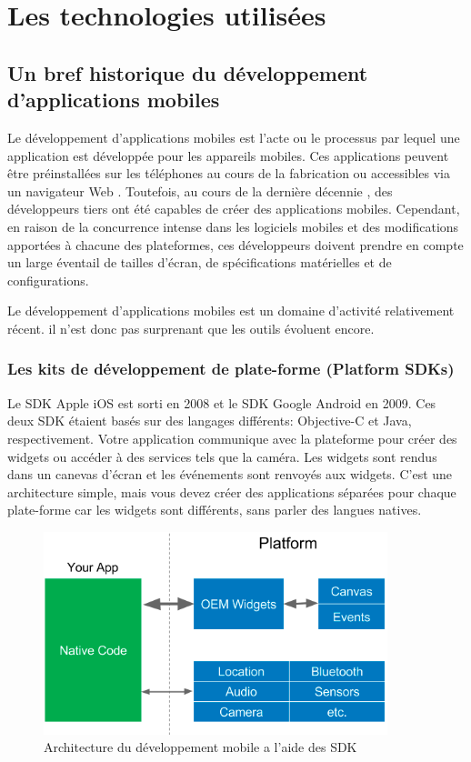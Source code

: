 

\chapter{Les technologies utilisées}

\section{Un bref historique du développement d'applications mobiles}
Le développement d'applications mobiles est l'acte ou le processus par lequel une application est développée pour les appareils mobiles. Ces applications peuvent être préinstallées sur les téléphones au cours de la fabrication ou accessibles via un navigateur Web \cite{noauthor_mobile_2019}. Toutefois, au cours de la dernière décennie \cite{leler_whats_2017}, des développeurs tiers ont été capables de créer des applications mobiles. Cependant, en raison de la concurrence intense dans les logiciels mobiles et des modifications apportées à chacune des plateformes, ces développeurs doivent prendre en compte un large éventail de tailles d'écran, de spécifications matérielles et de configurations.

Le développement d'applications mobiles est un domaine d'activité relativement récent. il n’est donc pas surprenant que les outils évoluent encore.
\newpage

\subsection{Les kits de développement de plate-forme (Platform SDKs)}
Le SDK Apple iOS est sorti en 2008 et le SDK Google Android en 2009. Ces deux SDK étaient basés sur des langages différents: Objective-C et Java, respectivement.
Votre application communique avec la plateforme pour créer des widgets ou accéder à des services tels que la caméra. Les widgets sont rendus dans un canevas d’écran et les événements sont renvoyés aux widgets. C'est une architecture simple, mais vous devez créer des applications séparées pour chaque plate-forme car les widgets sont différents, sans parler des langues natives\cite{leler_whats_2017}.

\begin{figure}[h]
	\begin{center}
		\includegraphics[width=10cm]{Images/chapter2/platform_sdk.png}
		\caption{{\footnotesize Architecture du développement mobile a l'aide des SDK\cite{leler_whats_2017}}}
	\end{center}
\end{figure}

